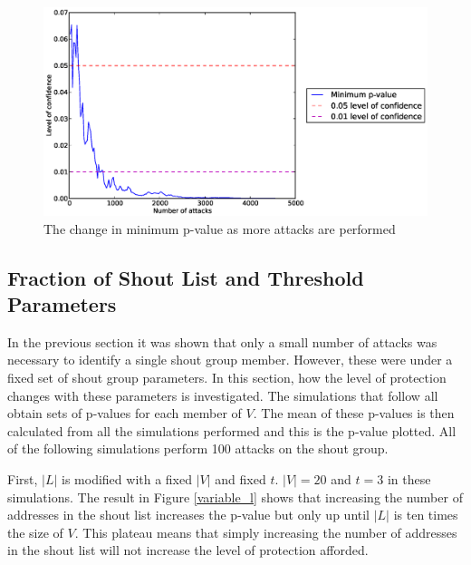\documentclass[ %
                    author={Luke Murray},
                supervisor={Dr. Simon Hollis},
                     title={Shadow Peer-to-Peer Networks},
                  subtitle={},
                    degree={MEng},
                      year={2013} ]{thesis}
\begin{document}
\begin{figure}[h]
    \centering
    \begin{minipage}[b]{0.8\linewidth}
        \centering
        \includegraphics[width=\linewidth]{diagrams/confidence_min.eps}
        \caption{The change in minimum p-value as more attacks are performed}
    \end{minipage}
    \label{confidence_min}
\end{figure}

\subsection{Fraction of Shout List and Threshold Parameters}

In the previous section it was shown that only a small number of attacks was necessary to identify a single shout group member. However, these were under a fixed set of shout group parameters. In this section, how the level of protection changes with these parameters is investigated. The simulations that follow all obtain sets of p-values for each member of $V$. The mean of these p-values is then calculated from all the simulations performed and this is the p-value plotted. All of the following simulations perform 100 attacks on the shout group.

First, $|L|$ is modified with a fixed $|V|$ and fixed $t$. $|V| = 20$ and $t = 3$ in these simulations. The result in Figure \ref{variable_l} shows that increasing the number of addresses in the shout list increases the p-value but only up until $|L|$ is ten times the size of $V$. This plateau means that simply increasing the number of addresses in the shout list will not increase the level of protection afforded. %
\end{document}
